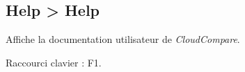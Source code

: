 \subsection{Help > Help}
\label{subsection:help}

\par
Affiche la documentation utilisateur de \emph{CloudCompare}.
\par
Raccourci clavier : \textcolor[rgb]{1.0,0.0,0.0}{F1}.
